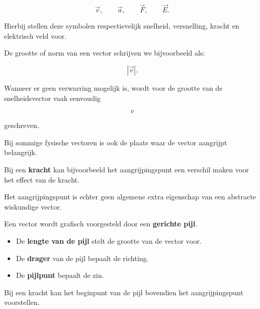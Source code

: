 \documentclass{ximera}
\begin{document}
\[
\vec{v},
\qquad
\vec{a},
\qquad
\vec{F},
\qquad
\vec{E}.
\]

Hierbij stellen deze symbolen respectievelijk snelheid, versnelling, kracht
en elektrisch veld voor.


De grootte of norm van een vector schrijven we bijvoorbeeld als:

\[
|\vec{v}|.
\]

Wanneer er geen verwarring mogelijk is, wordt voor de grootte van de
snelheidsvector vaak eenvoudig

\[
v
\]

geschreven.


\begin{opmerking}

Bij sommige fysische vectoren is ook de plaats waar de vector aangrijpt
belangrijk.

Bij een \textbf{kracht} kan bijvoorbeeld het aangrijpingspunt een verschil
maken voor het effect van de kracht.

Het aangrijpingspunt is echter geen algemene extra eigenschap van een
abstracte wiskundige vector.

\end{opmerking}




Een vector wordt grafisch voorgesteld door een \textbf{gerichte pijl}.

\begin{itemize}
    \item De \textbf{lengte van de pijl} stelt de grootte van de vector voor.
    \item De \textbf{drager} van de pijl bepaalt de richting.
    \item De \textbf{pijlpunt} bepaalt de zin.
\end{itemize}

Bij een kracht kan het beginpunt van de pijl bovendien het aangrijpingspunt
voorstellen.
\end{document}

